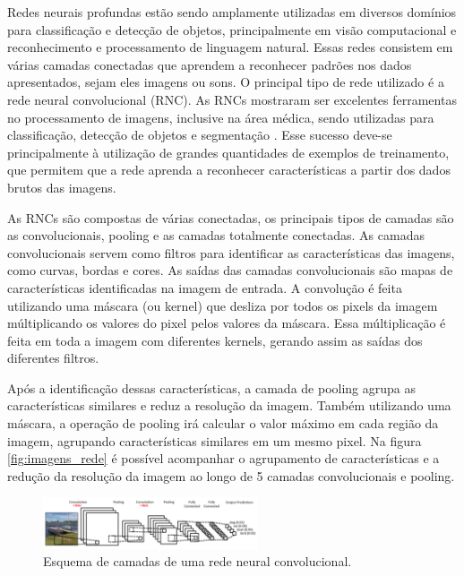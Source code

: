 \documentclass[conference]{IEEEtran}
\begin{document}

Redes neurais profundas estão sendo amplamente utilizadas em diversos domínios para classificação e detecção de objetos, principalmente em visão computacional e reconhecimento e processamento de linguagem natural. Essas redes consistem em várias camadas conectadas que aprendem a reconhecer padrões nos dados apresentados, sejam eles imagens ou sons. O principal tipo de rede utilizado é a rede neural convolucional (RNC). As RNCs mostraram ser excelentes ferramentas no processamento de imagens, inclusive na área médica, sendo utilizadas para classificação, detecção de objetos e segmentação \cite{greenspan2016}. Esse sucesso deve-se principalmente à utilização de grandes quantidades de exemplos de treinamento, que permitem que a rede aprenda a reconhecer características a partir dos dados brutos das imagens. %

As RNCs são compostas de várias conectadas, os principais tipos de camadas são as convolucionais, pooling e as camadas totalmente conectadas. As camadas convolucionais servem como filtros para identificar as características das imagens, como curvas, bordas e cores. As saídas das camadas convolucionais são mapas de características identificadas na imagem de entrada. A convolução é feita utilizando uma máscara (ou kernel) que desliza por todos os pixels da imagem múltiplicando os valores do pixel pelos valores da máscara. Essa múltiplicação é feita em toda a imagem com diferentes kernels, gerando assim as saídas dos diferentes filtros.

Após a identificação dessas características, a camada de pooling agrupa as características similares e reduz a resolução da imagem. Também utilizando uma máscara, a operação de pooling irá calcular o valor máximo em cada região da imagem, agrupando características similares em um mesmo pixel. Na figura \ref{fig:imagens_rede} é possível acompanhar o agrupamento de características e a redução da resolução da imagem ao longo de 5 camadas convolucionais e pooling.



\begin{figure}[!tp]
  \centering
  \includegraphics[width=2.5in]{img/convolucao.png}
  \caption{Esquema de camadas de uma rede neural convolucional.}
  \label{fig:convolucao}
\end{figure}
\end{document}
